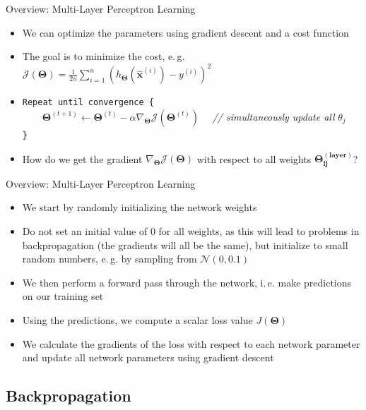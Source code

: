 \begin{frame}{Overview: Multi-Layer Perceptron Learning}{}
	\begin{itemize}
		\item We can optimize the parameters using gradient descent and a cost function
		\item The goal is to minimize the cost, e.\,g. $\mathcal{J}(\bm{\Theta}) = \frac{1}{2n} \sum_{i=1}^n (h_{\bm{\Theta}}(\bm{\widehat{x}}^{(i)}) - y^{(i)})^2$
		\item \texttt{Repeat until convergence \{} \\
			$\qquad \bm{\Theta}^{(t+1)} \longleftarrow \bm{\Theta}^{(t)} - \alpha \nabla_{\bm{\Theta}}
				\mathcal{J}(\bm{\Theta}^{(t)}) \quad$
			\textcolor{myblue1}{\textit{// simultaneously update all} $\theta_j$} \\
		\texttt{\}}
		\item How do we get the gradient $\nabla_{\bm{\Theta}} \mathcal{J}(\bm{\Theta})$ with respect to all weights $\bm{\Theta^{(\text{layer})}_{lj}}$?
	\end{itemize}
\end{frame}

\begin{frame}{Overview: Multi-Layer Perceptron Learning}{}
	\begin{itemize}
		\item We start by randomly initializing the network weights
		\item Do not set an initial value of 0 for all weights, as this will lead to problems in backpropagation (the gradients will all be the same), but initialize to small random numbers, e.\,g. by sampling from $\mathcal{N}(0, 0.1)$
		\item We then perform a forward pass through the network, i.\,e. make predictions on our training set
		\item Using the predictions, we compute a scalar loss value $J(\bm{\Theta})$
		\item We calculate the gradients of the loss with respect to each network parameter and update all network parameters using gradient descent
	\end{itemize}
\end{frame}


\subsection{Backpropagation}

